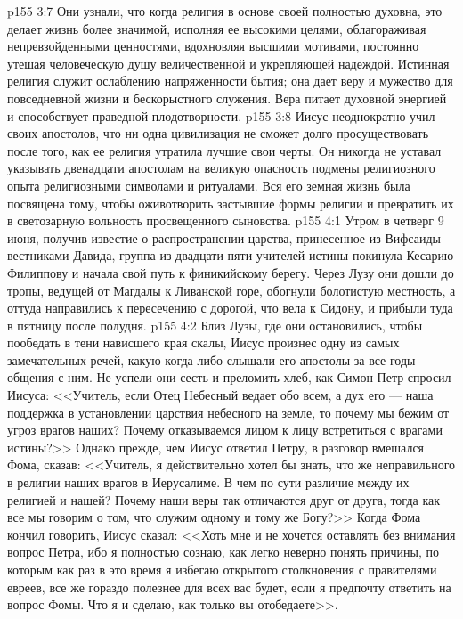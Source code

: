 \vs p155 3:7 Они узнали, что когда религия в основе своей полностью духовна, это делает жизнь более значимой, исполняя ее высокими целями, облагораживая непревзойденными ценностями, вдохновляя высшими мотивами, постоянно утешая человеческую душу величественной и укрепляющей надеждой. Истинная религия служит ослаблению напряженности бытия; она дает веру и мужество для повседневной жизни и бескорыстного служения. Вера питает духовной энергией и способствует праведной плодотворности.
\vs p155 3:8 Иисус неоднократно учил своих апостолов, что ни одна цивилизация не сможет долго просуществовать после того, как ее религия утратила лучшие свои черты. Он никогда не уставал указывать двенадцати апостолам на великую опасность подмены религиозного опыта религиозными символами и ритуалами. Вся его земная жизнь была посвящена тому, чтобы оживотворить застывшие формы религии и превратить их в светозарную вольность просвещенного сыновства.
\vs p155 4:1 Утром в четверг 9 июня, получив известие о распространении царства, принесенное из Вифсаиды вестниками Давида, группа из двадцати пяти учителей истины покинула Кесарию Филиппову и начала свой путь к финикийскому берегу. Через Лузу они дошли до тропы, ведущей от Магдалы к Ливанской горе, обогнули болотистую местность, а оттуда направились к пересечению с дорогой, что вела к Сидону, и прибыли туда в пятницу после полудня.
\vs p155 4:2 Близ Лузы, где они остановились, чтобы пообедать в тени нависшего края скалы, Иисус произнес одну из самых замечательных речей, какую когда\hyp{}либо слышали его апостолы за все годы общения с ним. Не успели они сесть и преломить хлеб, как Симон Петр спросил Иисуса: <<Учитель, если Отец Небесный ведает обо всем, а дух его --- наша поддержка в установлении царствия небесного на земле, то почему мы бежим от угроз врагов наших? Почему отказываемся лицом к лицу встретиться с врагами истины?>> Однако прежде, чем Иисус ответил Петру, в разговор вмешался Фома, сказав: <<Учитель, я действительно хотел бы знать, что же неправильного в религии наших врагов в Иерусалиме. В чем по сути различие между их религией и нашей? Почему наши веры так отличаются друг от друга, тогда как все мы говорим о том, что служим одному и тому же Богу?>> Когда Фома кончил говорить, Иисус сказал: <<Хоть мне и не хочется оставлять без внимания вопрос Петра, ибо я полностью сознаю, как легко неверно понять причины, по которым как раз в это время я избегаю открытого столкновения с правителями евреев, все же гораздо полезнее для всех вас будет, если я предпочту ответить на вопрос Фомы. Что я и сделаю, как только вы отобедаете>>.
